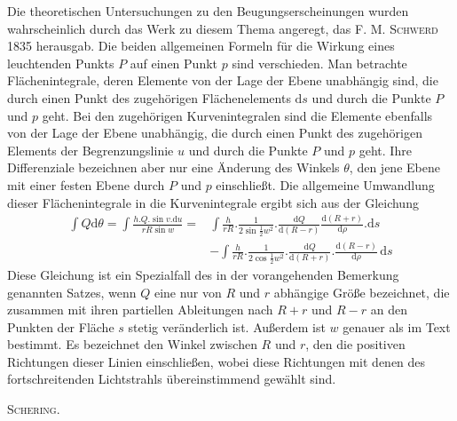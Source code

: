 Die theoretischen Untersuchungen zu den Beugungserscheinungen wurden wahrscheinlich durch das Werk zu diesem Thema angeregt, das \textsc{F. M. Schwerd} 1835 herausgab. Die beiden allgemeinen Formeln für die Wirkung eines leuchtenden Punkts $P$ auf einen Punkt $p$ sind verschieden. Man betrachte Flächenintegrale, deren Elemente von der Lage der Ebene unabhängig sind, die durch einen Punkt des zugehörigen Flächenelements $\mathrm ds$ und durch die Punkte $P$ und $p$ geht. Bei den zugehörigen Kurvenintegralen sind die Elemente ebenfalls von der Lage der Ebene unabhängig, die durch einen Punkt des zugehörigen Elements der Begrenzungslinie $u$ und durch die Punkte $P$ und $p$ geht. Ihre Differenziale bezeichnen aber nur eine Änderung des Winkels $\theta$, den jene Ebene mit einer festen Ebene durch $P$ und $p$ einschließt. Die allgemeine Umwandlung dieser Flächenintegrale in die Kurvenintegrale ergibt sich aus der Gleichung
\[
\begin{aligned}
\int Q\mathrm d\theta=\int\frac{h.Q.\sin v.\mathrm du}{rR\sin w}
={}&\int\frac h{rR}.\frac1{2\sin\frac12w^2}.\frac{\mathrm dQ}{\mathrm d(R-r)}\frac{\mathrm d(R+r)}{\mathrm d\rho}.\mathrm ds\\
&-\int\frac h{rR}.\frac1{2\cos\frac12w^2}.\frac{\mathrm dQ}{\mathrm d(R+r)}.\frac{\mathrm d(R-r)}{\mathrm d\rho}\,\mathrm ds
\end{aligned}
\]
Diese Gleichung ist ein Spezialfall des in der vorangehenden Bemerkung genannten Satzes, wenn $Q$ eine nur von $R$ und $r$ abhängige Größe bezeichnet, die zusammen mit ihren partiellen Ableitungen nach $R+r$ und $R-r$ an den Punkten der Fläche $s$ stetig veränderlich ist. Außerdem ist $w$ genauer als im Text bestimmt. Es bezeichnet den Winkel zwischen $R$ und $r$, den die positiven Richtungen dieser Linien einschließen, wobei diese Richtungen mit denen des fortschreitenden Lichtstrahls übereinstimmend gewählt sind.

\begin{flushright}\textsc{Schering.}\end{flushright}

\par\nopagebreak[4]\medskip\noindent\makebox[\linewidth][c]{\rule{.20\linewidth}{.35pt}}\par
\clearpage

